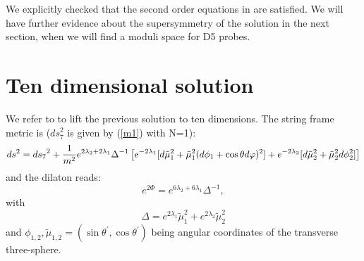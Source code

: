 \documentclass[a4paper,12pt]{article}
\begin{document}
We explicitly checked that the
second order equations in \cite{cve1} 
are satisfied. We will have further evidence about the
supersymmetry of the solution in the next section, when we will find
a moduli space for D5 probes.
\section{Ten dimensional solution}
We refer to \cite{cve2} to lift the previous solution to ten dimensions. The string frame metric is ($ds_{7}^{2}$ is given by (\ref{m1}) with N=1):
\begin{equation}
ds^2= {ds_{7}}^{2} + {1\over m^2}e^{2\lambda_{2}+2\lambda_{1}}\Delta^{-1}\left[e^{-2\lambda_{1}}[d{\tilde\mu}_{1}^{2}+{\tilde\mu}_{1}^{2}(d\phi_{1}+ \cos\theta d\varphi)^2]+ e^{-2\lambda_{2}}[d{\tilde\mu}_{2}^{2}+{\tilde\mu}_{2}^{2}d\phi_{2}^{2}] \right]
\end{equation}
and the dilaton reads:
\begin{equation}
e^{2\Phi}= e^{6\lambda_{2}+6\lambda_{1}}\Delta^{-1},
\end{equation}
with
\begin{equation}
\Delta= e^{2\lambda_{1}}{\tilde\mu}_{1}^{2}+e^{2\lambda_{2}}{\tilde\mu}_{2}^{2}
\end{equation}
and $\phi_{1,2}, \tilde\mu_{1,2}=(\sin\theta^\prime,\cos\theta^\prime)$
being angular coordinates of the transverse three-sphere.
\end{document}
